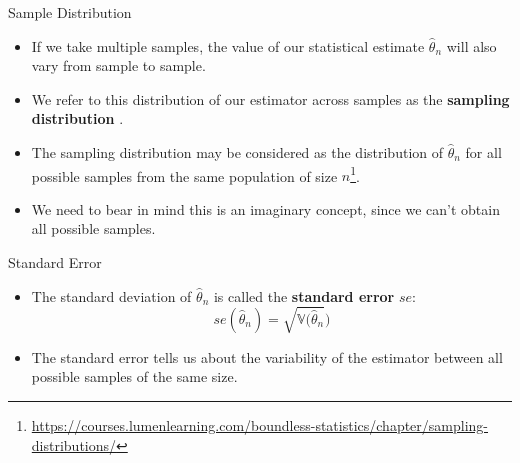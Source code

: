 \documentclass[handout]{beamer}
\begin{document}
\begin{frame}{Sample Distribution}

\scriptsize{

\begin{itemize}
\item If we take multiple samples, the value of our statistical estimate $\hat{\theta}_n$ will also vary from sample to sample.

\item We refer to this distribution of our estimator across samples as the   \textbf{sampling distribution} \cite{poldrack2019statistical}.

\item The sampling distribution may be considered as the distribution of  $\hat{\theta}_n$ for all possible samples from the same population of size $n$\footnote{\url{https://courses.lumenlearning.com/boundless-statistics/chapter/sampling-distributions/}}.

\item We need to bear in mind this is an imaginary concept, since we can't obtain all possible samples.

\end{itemize}

} 
\end{frame}


\begin{frame}{Standard Error}

\scriptsize{

\begin{itemize}
\item The standard deviation of $\hat{\theta}_n$ is called the \textbf{standard error} $se$:
\begin{displaymath}
se(\hat{\theta}_n)=\sqrt{\mathbb{V}(\hat{\theta}_n})
\end{displaymath}
\item The standard error tells us about the variability of the estimator between all possible samples of the same size.
\end{itemize}

} 
\end{frame}
\end{document}
